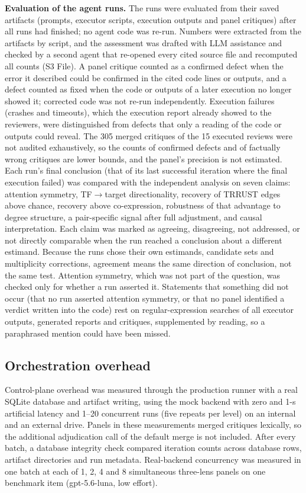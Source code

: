 \textbf{Evaluation of the agent runs.} The runs were evaluated from their saved artifacts (prompts, executor scripts, execution outputs and panel critiques) after all runs had finished; no agent code was re-run. Numbers were extracted from the artifacts by script, and the assessment was drafted with LLM assistance and checked by a second agent that re-opened every cited source file and recomputed all counts (S3 File). A panel critique counted as a confirmed defect when the error it described could be confirmed in the cited code lines or outputs, and a defect counted as fixed when the code or outputs of a later execution no longer showed it; corrected code was not re-run independently. Execution failures (crashes and timeouts), which the execution report already showed to the reviewers, were distinguished from defects that only a reading of the code or outputs could reveal. The 305 merged critiques of the 15 executed reviews were not audited exhaustively, so the counts of confirmed defects and of factually wrong critiques are lower bounds, and the panel's precision is not estimated. Each run's final conclusion (that of its last successful iteration where the final execution failed) was compared with the independent analysis on seven claims: attention symmetry, TF$\to$target directionality, recovery of TRRUST edges above chance, recovery above co-expression, robustness of that advantage to degree structure, a pair-specific signal after full adjustment, and causal interpretation. Each claim was marked as agreeing, disagreeing, not addressed, or not directly comparable when the run reached a conclusion about a different estimand. Because the runs chose their own estimands, candidate sets and multiplicity corrections, agreement means the same direction of conclusion, not the same test. Attention symmetry, which was not part of the question, was checked only for whether a run asserted it. Statements that something did not occur (that no run asserted attention symmetry, or that no panel identified a verdict written into the code) rest on regular-expression searches of all executor outputs, generated reports and critiques, supplemented by reading, so a paraphrased mention could have been missed.

\subsection*{Orchestration overhead}

Control-plane overhead was measured through the production runner with a real SQLite database and artifact writing, using the mock backend with zero and 1-s artificial latency and 1--20 concurrent runs (five repeats per level) on an internal and an external drive. Panels in these measurements merged critiques lexically, so the additional adjudication call of the default merge is not included. After every batch, a database integrity check compared iteration counts across database rows, artifact directories and run metadata. Real-backend concurrency was measured in one batch at each of 1, 2, 4 and 8 simultaneous three-lens panels on one benchmark item (gpt-5.6-luna, low effort).

